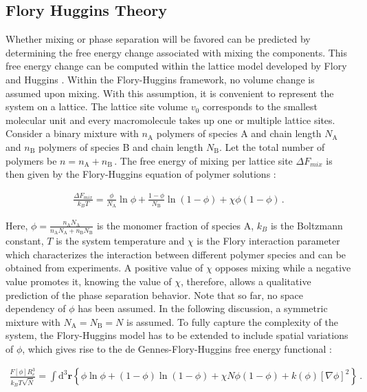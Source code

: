 \documentclass[bachelor,       %
               twoside,        %
               BCOR10mm,       %
                ngerman,english  %
               ]{GAUBM}
\begin{document}
\subsection{Flory Huggins Theory}

Whether mixing or phase separation will be favored can be predicted by determining the free energy change associated with mixing the components. This free energy change can be computed within the lattice model developed by Flory and Huggins \cite{Flory42}. Within the Flory-Huggins framework, no volume change is assumed upon mixing. With this assumption, it is convenient to represent the system on a lattice. The lattice site volume $v_0$ corresponds to the smallest molecular unit and every macromolecule takes up one or multiple lattice sites. Consider a binary mixture with $n_\mathrm A$ polymers of species A and chain length $N_\mathrm A$ and $n_\mathrm B$ polymers of species B and chain length $N_\mathrm B$. Let the total number of polymers be $n=n_\mathrm A+n_\mathrm B\,.$ The free energy of mixing per lattice site $\Delta F_{mix}$ is then given by the Flory-Huggins equation of polymer solutions \cite[S. 143]{Rubin03}:

\begin{align}
  \frac{\Delta F_{mix}}{k_BT}=\frac{\phi}{N_\mathrm A}\ln\phi+\frac{1-\phi}{N_\mathrm B}\ln(1-\phi)+\chi\phi(1-\phi)\,.
\end{align}

Here, $\phi=\frac{n_\mathrm AN_\mathrm A}{n_\mathrm AN_\mathrm A+n_\mathrm BN_\mathrm B}$ is the monomer fraction of species A, $k_B$ is the Boltzmann constant, $T$ is the system temperature and $\chi$ is the Flory interaction parameter which characterizes the interaction between different polymer species and can be obtained from experiments. A positive value of $\chi$ opposes mixing while a negative value promotes it, knowing the value of $\chi$, therefore, allows a qualitative prediction of the phase separation behavior. Note that so far, no space dependency of $\phi$ has been assumed. In the following discussion, a symmetric mixture with $N_\mathrm A=N_\mathrm B=N$ is assumed. To fully capture the complexity of the system, the Flory-Huggins model has to be extended to include spatial variations of $\phi$, which gives rise to the de Gennes-Flory-Huggins free energy functional  \cite{deGennes80, Reister02}:


\begin{align}
  \frac{F[\phi]R_e^3}{k_BT\sqrt{\bar N}}=\int \mathrm{d}^3\mathbf{r}\left\{\phi\ln\phi+(1-\phi)\ln(1-\phi)+\chi N\phi(1-\phi)+k(\phi)[\nabla\phi]^2\right\}\,.
  \label{eq:flory_fctl}
\end{align}
\end{document}
